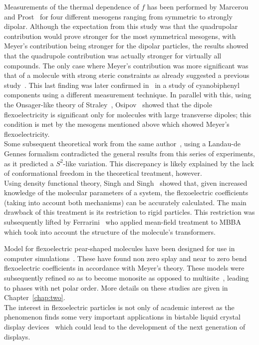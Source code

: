 Measurements of the thermal dependence of $f$ has been performed by Marcerou and 
Prost~\cite{MarcerouProst80} for four different mesogens ranging from symmetric to strongly dipolar. 
Although the expectation from this study was that the quadrupolar contribution would prove stronger for 
the most symmetrical mesogens, with Meyer's contribution being stronger for the dipolar
particles, the results 
showed that the quadrupole contribution was actually stronger for virtually all compounds. The only case
where  Meyer's contribution was more significant was that of a molecule with strong steric constraints as
already suggested a previous study~\cite{ProstMarcerou78a}. This last  finding was later confirmed 
in~\cite{DozovMartinotLagarde83} in a study of cyanobiphenyl components using a different
measurement technique. In parallel with this, using the Onsager-like theory of Straley~\cite{Straley76}, 
Osipov~\cite{Osipov83} showed that the dipole flexoelectricity is significant only for molecules 
with large transverse dipoles; this condition is met by the mesogens mentioned above which showed 
Meyer's flexoelectricity.\\
Some subsequent theoretical work from the same author~\cite{Osipov84}, using a Landau-de Gennes 
formalism contradicted the  general results from this series of experiments, as it predicted a 
$S^2$-like  variation.  This discrepancy is likely  explained by the lack of conformational 
freedom in the theoretical treatment, however.\\
Using density functional theory, Singh and Singh~\cite{SinghSingh89} showed that, given increased 
knowledge of the molecular parameters of a system, the flexoelectric coefficients 
(taking into account both mechanisms) can be  accurately calculated. The main drawback of this
treatment is its restriction to rigid particles. This restriction was subsequently lifted by 
Ferrarini~\cite{Ferarrini01} who applied mean-field treatment to MBBA which took into account 
the structure of the molecule's transformers.

Model for flexoelectric pear-shaped molecules have been designed for use in computer 
simulations~\cite{StelzerBerardi99,BilleterPelcovits00}. These have found non zero splay and near to
zero bend flexoelectric coefficients in accordance with Meyer's theory. These models were
subsequently refined so as to become monosite as opposed to multisite~\cite{BerardiRicci01},
leading to phases with net polar order. More details on these studies 
are given in Chapter~\ref{chap:two}.\\

The interest in flexoelectric particles is not only of academic interest as the phenomenon finds
some very important applications in bistable liquid crystal display
devices~\cite{DavidsonMottram02,DennistonYeomans} which could lead to the development of the
next generation of displays.

